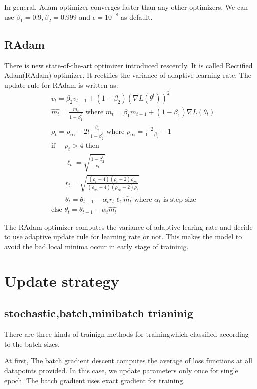 \documentclass[11pt]{article}
\begin{document}
	In general, Adam optimizer converges faster than any other optimizers. We can use $\beta_1=0.9,\beta_2=0.999$ and $\epsilon=10^{-8}$ as default.
	\subsection{\cite{liu2019variance} RAdam}
	There is new state-of-the-art optimizer introduced rescently. It is called Rectified Adam(RAdam) optimizer. It rectifies the variance of adaptive learning rate. The update rule for RAdam is written as:
	\begin{equation*}
		\begin{aligned}
			&v_t=\beta_2 v_{t-1}+(1-\beta_2)(\nabla L(\theta^t))^2\\
			&\hat{m_t}=\frac{m_t}{1-\beta_1^t}\mbox{ where }m_t=\beta_1m_{t-1}+(1-\beta_1)\nabla L(\theta_t)\\
			&\rho_t=\rho_{\infty}-2t\frac{\beta_2^t}{1-\beta_2^t} \mbox{ where }\rho_{\infty}=\frac{2}{1-\beta_2}-1\\
			&\mbox{if } \quad\rho_t>4 \mbox{ then}\\
			&\quad\quad \ell_t=\sqrt{\frac{1-\beta_2^t}{v_t}}\\
			&\quad\quad r_t=\sqrt{\frac{(\rho_t-4)(\rho_t-2)\rho_{\infty}}{(\rho_{\infty}-4)(\rho_{\infty}-2)\rho_t}}\\
			&\quad\quad \theta_t=\theta_{t-1}-\alpha_tr_t\ell_t\hat{m_t}\mbox{ where } \alpha_t \mbox{ is step size}\\
			& \mbox{else } \theta_t=\theta_{t-1}-\alpha_t\hat{m_t}
		\end{aligned}
	\end{equation*}

	The RAdam optimizer computes the variance of adaptive learing rate and decide to use adaptive update rule for learning rate or not. This makes the model to avoid the bad local minima occur in early stage of traininig.
	\section{Update strategy}
	\subsection{stochastic,batch,minibatch trianinig}
	There are three kinds of trainign methods for trainingwhich classified according to the batch sizes.

	At first, The batch gradient descent computes the average of loss functions at all datapoints provided. In this case, we update parameters only once for single epoch. The batch gradient uses exact gradient for training. 
\end{document}
